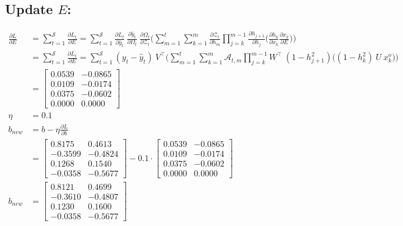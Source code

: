 \documentclass{article}
\begin{document}
\subsection{Update $E$:}
\begin{align*}
     \frac{\partial L}{ \partial{E}} &= \sum_{t=1}^{\mathcal{S}} \frac{\partial L_t}{ \partial{E}} =
\sum_{t=1}^{\mathcal{S}}
\frac{\partial L_t}{\partial \hat{y}_t}~\frac{\partial \hat{y}_t}{\partial \Omega_t}~\frac{\partial \Omega_t}{ \partial \mathcal{Z}_t} \biggl( 
\sum_{m=1}^{t}
\sum_{k=1}^{m} \frac{\partial \mathcal{Z}_t}{ \partial h_m} 
\prod_{j=k}^{m-1} \frac{\partial h_{j+1}}{ \partial h_j} 
\biggl( \frac{\partial h_k}{ \partial x_k}\frac{\partial x_k}{ \partial E} \biggl) \biggl) \\
&= \sum_{t=1}^{\mathcal{S}} \frac{\partial L_t}{ \partial{E}} =
\sum_{t=1}^{\mathcal{S}}
(y_t - \hat{y}_t)~V^\top \biggl( 
\sum_{m=1}^{t}
\sum_{k=1}^{m} \mathcal{A}_{t,m} 
\prod_{j=k}^{m-1} W^\top ~ (1 - h_{j+1}^2)
\biggl( (1-h_k^2)~ U~ x^o_k \biggl) \biggl) \\
 &=\begin{bmatrix}
 0.0539 & -0.0865 \\
 0.0109 & -0.0174 \\
 0.0375 & -0.0602 \\
 0.0000 &  0.0000
\end{bmatrix} \\
\eta &= 0.1\\
b_{new} &= b - \eta \frac{\partial L}{\partial b}\\
 &= \begin{bmatrix}
  0.8175 & 0.4613 \\
 -0.3599 & -0.4824 \\
  0.1268 & 0.1540 \\
 -0.0358 & -0.5677
\end{bmatrix}- 0.1 \cdot \begin{bmatrix}
 0.0539 & -0.0865 \\
 0.0109 & -0.0174 \\
 0.0375 & -0.0602 \\
 0.0000 &  0.0000
\end{bmatrix} \\
b_{new} &= \begin{bmatrix}
0.8121 & 0.4699 \\
-0.3610 & -0.4807 \\
0.1230 & 0.1600 \\
-0.0358 & -0.5677
\end{bmatrix}
\end{align*}
\end{document}
